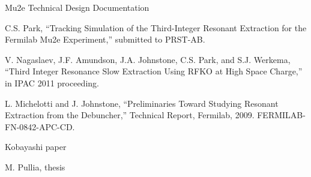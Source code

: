 \documentclass[aps,prstab,onecolumn,preprint,endfloats,11pt]{revtex4-1}
\begin{document}

\begin{thebibliography}{77}
  Mu2e Technical Design Documentation

  C.S. Park, ``Tracking Simulation of the Third-Integer Resonant Extraction for 
the Fermilab Mu2e Experiment,'' submitted to PRST-AB.

  V. Nagaslaev, J.F. Amundson, J.A. Johnstone, C.S. Park, and S.J. Werkema, 
``Third Integer Resonance Slow Extraction Using RFKO at High Space Charge,'' in 
IPAC 2011 proceeding.

  L. Michelotti and J. Johnstone, ``Preliminaries Toward Studying Resonant 
Extraction from
the Debuncher,'' Technical Report, Fermilab, 2009. FERMILAB-FN-0842-APC-CD.

  Kobayashi paper

  M. Pullia, thesis
\end{thebibliography}


\clearpage
\end{document}
